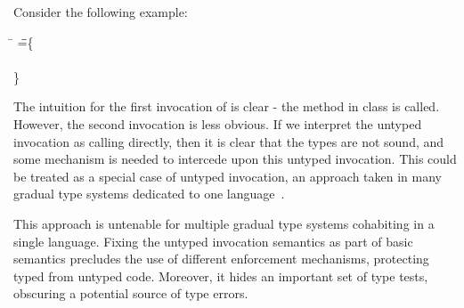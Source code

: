 \documentclass[a4paper,USenglish]{tex/lipics-v2016}
\begin{document}
Consider the following example:

\begin{tabbing}
\hspace{1cm}\K\HS\=
 \HS\HS\HS\HS\HS\HS\HS\HS\HS\HS\WHERE
  \K\HS =\HS \= \class\= \C \{\\
\>        \> \HS {}\\
   \>    \> \}
\end{tabbing}

The intuition for the first invocation of \m is clear - the method \m in class \C is called.
However, the second invocation is less obvious. If we interpret the untyped
invocation as calling \m directly, then it is clear that the types 
are not sound, and some mechanism is needed to intercede upon this untyped invocation.
This could be treated as a special case of untyped invocation, an approach taken in
many gradual type systems dedicated to one language~\cite{popl10,ecoop15,Muehlboeck2017}.

This approach is untenable for multiple gradual type systems cohabiting in a
single language. Fixing the untyped invocation semantics as part of basic
semantics precludes  the use of different enforcement mechanisms, protecting
typed from untyped code. Moreover, it hides an important set of type tests, 
obscuring a potential source of type errors.
\end{document}
